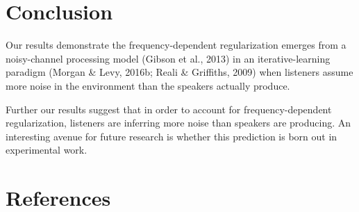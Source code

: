 \documentclass[10pt, letterpaper]{article}
\begin{document}
\hypertarget{conclusion}{%
\section{Conclusion}\label{conclusion}}

Our results demonstrate the frequency-dependent regularization emerges
from a noisy-channel processing model (Gibson et al., 2013) in an
iterative-learning paradigm (Morgan \& Levy, 2016b; Reali \& Griffiths,
2009) when listeners assume more noise in the environment than the
speakers actually produce.

Further our results suggest that in order to account for
frequency-dependent regularization, listeners are inferring more noise
than speakers are producing. An interesting avenue for future research
is whether this prediction is born out in experimental work.

\hypertarget{references}{%
\section{References}\label{references}}

\setlength{\parindent}{-0.1in} 
\setlength{\leftskip}{0.125in}

\noindent
\end{document}
